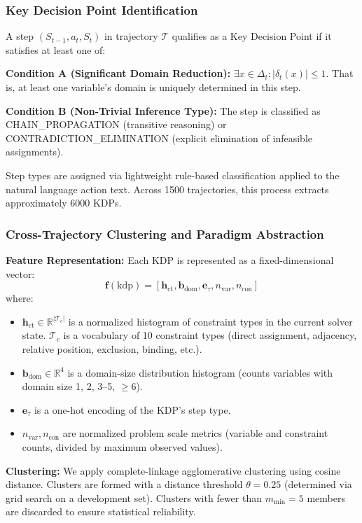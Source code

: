 \subsubsection{Key Decision Point Identification}

A step $(S_{t-1}, a_t, S_t)$ in trajectory $\mathcal{T}$ qualifies as a Key Decision Point if it satisfies at least one of:

\textbf{Condition A (Significant Domain Reduction):} $\exists x \in \Delta_t : |\delta_t(x)| \leq 1$. That is, at least one variable's domain is uniquely determined in this step.

\textbf{Condition B (Non-Trivial Inference Type):} The step is classified as CHAIN\_PROPAGATION (transitive reasoning) or CONTRADICTION\_ELIMINATION (explicit elimination of infeasible assignments).

Step types are assigned via lightweight rule-based classification applied to the natural language action text. Across 1500 trajectories, this process extracts approximately 6000 KDPs.

\subsubsection{Cross-Trajectory Clustering and Paradigm Abstraction}

\textbf{Feature Representation:} Each KDP is represented as a fixed-dimensional vector:
\[
\mathbf{f}(\text{kdp}) = [\mathbf{h}_{\text{ct}}, \mathbf{b}_{\text{dom}}, \mathbf{e}_\tau, n_{\text{var}}, n_{\text{con}}]
\]
where:
\begin{itemize}
    \item $\mathbf{h}_{\text{ct}} \in \mathbb{R}^{|\mathcal{T}_c|}$ is a normalized histogram of constraint types in the current solver state. $\mathcal{T}_c$ is a vocabulary of 10 constraint types (direct assignment, adjacency, relative position, exclusion, binding, etc.).
    \item $\mathbf{b}_{\text{dom}} \in \mathbb{R}^4$ is a domain-size distribution histogram (counts variables with domain size 1, 2, 3--5, $\geq 6$).
    \item $\mathbf{e}_\tau$ is a one-hot encoding of the KDP's step type.
    \item $n_{\text{var}}, n_{\text{con}}$ are normalized problem scale metrics (variable and constraint counts, divided by maximum observed values).
\end{itemize}

\textbf{Clustering:} We apply complete-linkage agglomerative clustering using cosine distance. Clusters are formed with a distance threshold $\theta = 0.25$ (determined via grid search on a development set). Clusters with fewer than $m_{\min} = 5$ members are discarded to ensure statistical reliability.

